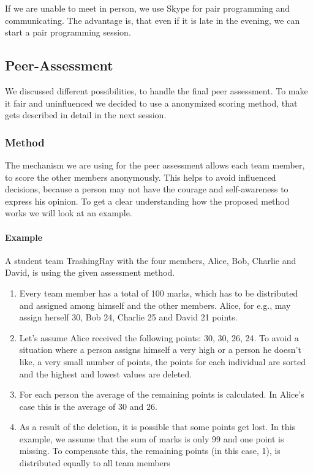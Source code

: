 \documentclass[10pt]{scrartcl}
\begin{document}
If we are unable to meet in person, we use Skype for pair programming and communicating. The advantage is, that even if it is late in the evening, we can start a pair programming session. 

\subsection{Peer-Assessment}

We discussed different possibilities, to handle the final peer assessment. To make it fair and uninfluenced we decided to use a anonymized scoring method, that gets described in detail in the next session.

\subsubsection{Method}

The mechanism we are using for the peer assessment allows each team member, to score the other members anonymously. This helps to avoid influenced decisions, because a person may not have the courage and self-awareness to express his opinion. To get a clear understanding how the proposed method works we will look at an example.

\paragraph{Example}

A student team TrashingRay with the four members, Alice, Bob, Charlie and David, is using the given assessment method. 

\begin{enumerate}  
\item Every team member has a total of 100 marks, which has to be distributed and assigned among himself and the other members. Alice, for e.g., may assign herself 30, Bob 24, Charlie 25 and David 21 points. 
\item Let's assume Alice received the following points: 30, 30, 26, 24. To avoid a situation where a person assigns himself a very high or a person he doesn't like, a very small number of points, the points for each individual are sorted and the highest and lowest values are deleted. 
\item For each person the average of the remaining points is calculated. In Alice's case this is the average of 30 and 26. 
\item As a result of the deletion, it is possible that some points get \grqq{}lost\grqq{}. In this example, we assume that the sum of marks is only 99 and one point is missing. To compensate this, the remaining points (in this case, 1), is distributed equally to all team members 
\end{enumerate}
\end{document}
